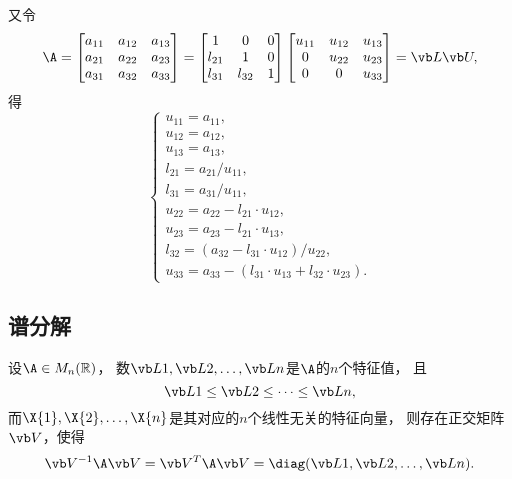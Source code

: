 又令\[
	\A = \begin{bmatrix}
		a_{11} & a_{12} & a_{13} \\
		a_{21} & a_{22} & a_{23} \\
		a_{31} & a_{32} & a_{33}
	\end{bmatrix}
	= \begin{bmatrix}
		1 & 0 & 0 \\
		l_{21} & 1 & 0 \\
		l_{31} & l_{32} & 1
	\end{bmatrix}
	\begin{bmatrix}
		u_{11} & u_{12} & u_{13} \\
		0 & u_{22} & u_{23} \\
		0 & 0 & u_{33}
	\end{bmatrix} = \L \U,
\]
得\[
	\left\{\begin{array}{l}
		u_{11} = a_{11}, \\
		u_{12} = a_{12}, \\
		u_{13} = a_{13}, \\
		l_{21} = a_{21} / u_{11}, \\
		l_{31} = a_{31} / u_{11}, \\
		u_{22} = a_{22} - l_{21} \cdot u_{12}, \\
		u_{23} = a_{23} - l_{21} \cdot u_{13}, \\
		l_{32} = (a_{32} - l_{31} \cdot u_{12}) / u_{22}, \\
		u_{33} = a_{33} - (l_{31} \cdot u_{13} + l_{32} \cdot u_{23}).
	\end{array}\right.
\]
\endgroup%

\subsection{谱分解}
\begin{theorem}
设\(\A \in M_n(\mathbb{R})\)，
数\(\L{1},\L{2},\dotsc,\L{n}\)是\(\A\)的\(n\)个特征值，
且\[
	\L{1}\leq\L{2}\leq\dotsb\leq\L{n},
\]
而\(\X{1},\X{2},\dotsc,\X{n}\)是其对应的\(n\)个线性无关的特征向量，
则存在正交矩阵\(\Q\)，使得\[
	\Q^{-1}\A\Q = \Q^T\A\Q = \diag(\L{1},\L{2},\dotsc,\L{n}).
\]
\end{theorem}

